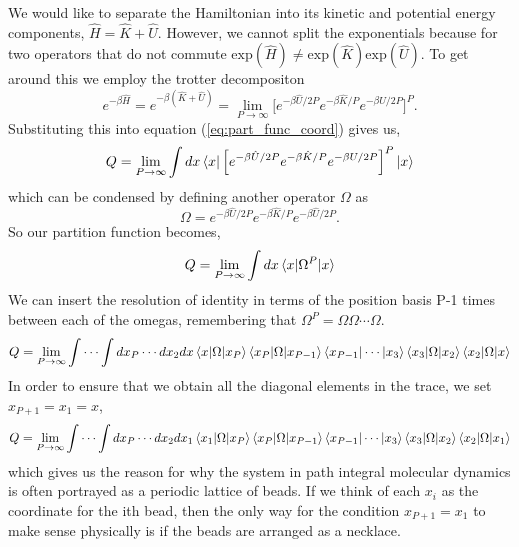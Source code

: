 \documentclass{article}
\newcommand{\be}{\begin{equation}}
\newcommand{\ee}{\end{equation}}
\begin{document}
%
We would like to separate the Hamiltonian into its kinetic and potential energy components, $\hat{H} = \hat{K} + \hat{U}$.
However, we cannot split the exponentials because for two operators that do not commute $\text{exp}(\hat{H}) \neq \text{exp}(\hat{K}) \text{exp}(\hat{U})$.
To get around this we employ the trotter decompositon
\be
  e^{- \beta \hat{H}} = e^{- \beta (\hat{K} + \hat{U})} = \lim_{P \to\infty} \Big[ e^{- \beta \hat{U}/2P} e^{-\beta \hat{K}/P} e^{-\beta{U}/2P} \Big]^P .
\ee
Substituting this into equation (\ref{eq:part_func_coord}) gives us,
\be
  Q = \lim_{P \to\infty} \int dx \bra{x} \Big[ e^{- \beta \hat{U}/2P} e^{-\beta \hat{K}/P} e^{-\beta{U}/2P} \Big]^P \ket{x}
\ee
which can be condensed by defining another operator $\Omega$ as
\be
  \Omega = e^{-\beta \hat{U}/2P} e^{-\beta \hat{K}/P} e^{-\beta \hat{U}/2P} .
\ee
So our partition function becomes,
\be
  Q = \lim_{P \to\infty} \int dx \braket{x|\Omega^P|x}
\ee
We can insert the resolution of identity in terms of the position basis P-1 times between each of the omegas, remembering that $\Omega^P = \Omega \Omega \cdots \Omega$.
\be
  Q = \lim_{P \to\infty} \int \cdots \int dx_P \cdots dx_2 dx \braket{x|\Omega|x_P} \braket{x_P|\Omega|x_{P-1}} \bra{x_{P-1}} \cdots \ket{x_3} \braket{x_3|\Omega|x_2} \braket{x_2|\Omega|x}
\ee
In order to ensure that we obtain all the diagonal elements in the trace, we set $x_{P+1} = x_1 = x$,
\be \label{eq:part_func_path_int}
  Q = \lim_{P \to\infty} \int \cdots \int dx_P \cdots dx_2 dx_1 \braket{x_1|\Omega|x_P} \braket{x_P|\Omega|x_{P-1}} \bra{x_{P-1}} \cdots \ket{x_3} \braket{x_3|\Omega|x_2} \braket{x_2|\Omega|x_1}
\ee
which gives us the reason for why the system in path integral molecular dynamics is often portrayed as a periodic lattice of beads.
If we think of each $x_i$ as the coordinate for the ith bead, then the only way for the condition $x_{P+1} = x_1$ to make sense physically is if the beads are arranged as a necklace.
\end{document}
